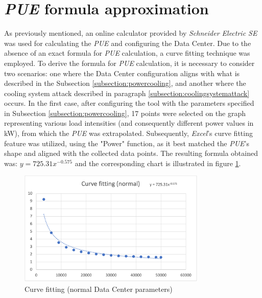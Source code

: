 \section{\emph{PUE} formula approximation}
As previously mentioned, an online calculator provided by \emph{Schneider Electric SE} was used for calculating the \emph{PUE} and configuring the Data Center. Due to the absence of an exact formula for \emph{PUE} calculation, a curve fitting technique was employed. To derive the formula for \emph{PUE} calculation, it is necessary to consider two scenarios: one where the Data Center configuration aligns with what is described in the Subsection \ref{subsection:powercooling}, and another where the cooling system attack described in paragraph \ref{subsection:coolingsystemattack} occurs. In the first case, after configuring the tool with the parameters specified in Subsection \ref{subsection:powercooling}, 17 points were selected on the graph representing various load intensities (and consequently different power values in kW), from which the \emph{PUE} was extrapolated. Subsequently, \emph{Excel}'s curve fitting feature was utilized, using the "Power" function, as it best matched the \emph{PUE}'s shape and aligned with the collected data points. The resulting formula obtained was: \(y = 725.31x^{-0.575}\) and the corresponding chart is illustrated in figure \ref{fig:curve_fitting_normal}. 
\begin{figure}[h]
    \centering
    \includegraphics[width=0.8\textwidth]{chapters/images/curve_fitting_normal.png}
    \caption{Curve fitting (normal Data Center parameters)}
    \label{fig:curve_fitting_normal}
\end{figure}


